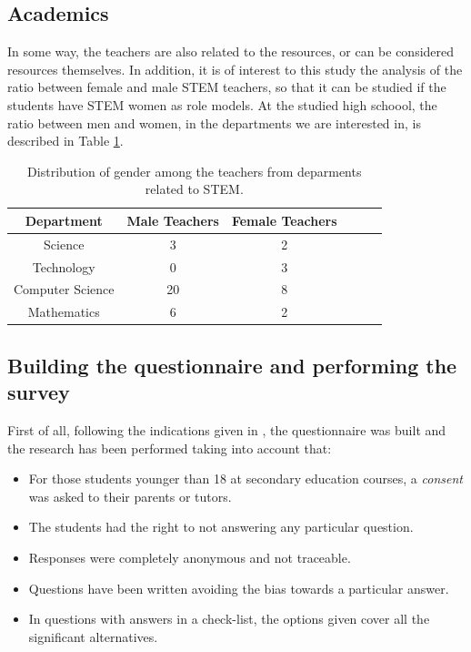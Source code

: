 \documentclass[journal,transmag]{IEEEtran}
\begin{document}
\subsection{Academics}

In some way, the teachers are also related to the resources, or can be considered resources themselves. In addition, it is of interest to this study the analysis of the ratio between female and male STEM teachers, so that it can be studied if the students have STEM women as role models. At the studied high schoool, the ratio between men and women, in the departments we are interested in, is described in Table \ref{tab:teachers}.

\begin{table}
	\caption[Teachers in STEM departments]{Distribution of gender among the teachers from deparments related to STEM.}
	\label{tab:teachers}
	
	\begin{center}
		\begin{tabular}{|c|c|c||c|c|c|}
			\hline
			\textbf{Department} & \textbf{Male Teachers} & \textbf{Female Teachers} \\ \hline
			Science & 3 & 2 \\ \hline
			Technology & 0 & 3 \\ \hline
			Computer Science & 20 & 8 \\ \hline
			Mathematics & 6 & 2 \\
			\hline
		\end{tabular}
	\end{center}
\end{table}

\subsection{Building the questionnaire and performing the survey}

First of all, following the indications given in \cite{cohen2013research}, the questionnaire was built and the research has been performed taking into account that:

\begin{itemize}
  \item For those students younger than 18 at secondary education courses, a \textit{consent} was asked to their parents or tutors.
  \item The students had the right to not answering any particular question.
  \item Responses were completely anonymous and not traceable.
  \item Questions have been written avoiding the bias towards a particular answer.
  \item In questions with answers in a check-list, the options given cover all the significant alternatives.
\end{itemize}
\end{document}
